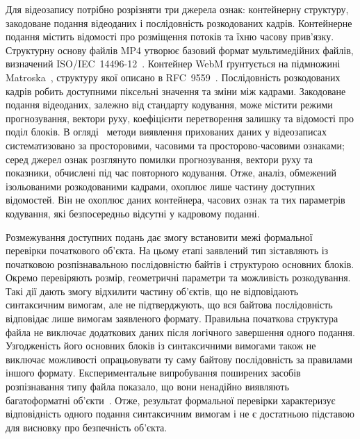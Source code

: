 Для відеозапису потрібно розрізняти три джерела ознак: контейнерну структуру, закодоване подання відеоданих і послідовність розкодованих кадрів. Контейнерне подання містить відомості про розміщення потоків та їхню часову прив’язку. Структурну основу файлів MP4 утворює базовий формат мультимедійних файлів, визначений ISO/IEC~14496-12~\cite{iso2026isobmff}. Контейнер WebM ґрунтується на підмножині Matroska~\cite{webm2026container}, структуру якої описано в RFC~9559~\cite{rfc9559matroska}. Послідовність розкодованих кадрів робить доступними піксельні значення та зміни між кадрами. Закодоване подання відеоданих, залежно від стандарту кодування, може містити режими прогнозування, вектори руху, коефіцієнти перетворення залишку та відомості про поділ блоків. В огляді~\cite{bouzegza2022video} методи виявлення прихованих даних у відеозаписах систематизовано за просторовими, часовими та просторово-часовими ознаками; серед джерел ознак розглянуто помилки прогнозування, вектори руху та показники, обчислені під час повторного кодування. Отже, аналіз, обмежений ізольованими розкодованими кадрами, охоплює лише частину доступних відомостей. Він не охоплює даних контейнера, часових ознак та тих параметрів кодування, які безпосередньо відсутні у кадровому поданні.

Розмежування доступних подань дає змогу встановити межі формальної перевірки початкового об’єкта. На цьому етапі заявлений тип зіставляють із початковою розпізнавальною послідовністю байтів і структурою основних блоків. Окремо перевіряють розмір, геометричні параметри та можливість розкодування. Такі дії дають змогу відхилити частину об’єктів, що не відповідають синтаксичним вимогам, але не підтверджують, що вся байтова послідовність відповідає лише вимогам заявленого формату. Правильна початкова структура файла не виключає додаткових даних після логічного завершення одного подання. Узгодженість його основних блоків із синтаксичними вимогами також не виключає можливості опрацьовувати ту саму байтову послідовність за правилами іншого формату. Експериментальне випробування поширених засобів розпізнавання типу файла показало, що вони ненадійно виявляють багатоформатні об’єкти~\cite{koch2022polyglot}. Отже, результат формальної перевірки характеризує відповідність одного подання синтаксичним вимогам і не є достатньою підставою для висновку про безпечність об’єкта.

